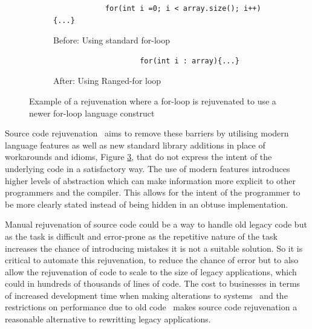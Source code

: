 \documentclass[bsc,frontabs,singlespacing,twoside,parskip,deptreport]{infthesis}
\begin{document}
\begin{figure}[H]
    \centering
    
    \begin{subfigure}[h]{\textwidth}
        \begin{verbatim}
            for(int i =0; i < array.size(); i++){...}
        \end{verbatim}
        \caption{Before: Using standard for-loop}
        \vspace{0.2cm}
        \label{fig:for-arr-before}
    \end{subfigure}
    
    \begin{subfigure}[h]{\textwidth}
        \centering
        \begin{verbatim}
                    for(int i : array){...}
        \end{verbatim}
        \caption{After: Using Ranged-for loop}
        \label{fig:for-arr-after}
    \end{subfigure}

    \caption{Example of a rejuvenation where a for-loop is rejuvenated to use a newer for-loop language construct}
    \label{fig:example-rejuv}
\end{figure}


    
Source code rejuvenation~\cite{STROUSTRUP_REJUV} aims to remove these barriers by utilising modern language features as well as new standard library additions in place of workarounds and idioms, Figure \ref{fig:example-rejuv}, that do not express the intent of the underlying code in a satisfactory way. The use of modern features introduces higher levels of abstraction which can make information more explicit to other programmers and the compiler. This allows for the intent of the programmer to be more clearly stated instead of being hidden in an obtuse implementation. 

Manual rejuvenation of source code could be a way to handle old legacy code but as the task is difficult and error-prone as the repetitive nature of the task increases the chance of introducing mistakes it is not a suitable solution. So it is critical to automate this rejuvenation, to reduce the chance of error but to also allow the rejuvenation of code to scale to the size of legacy applications, which could in hundreds of thousands of lines of code. The cost to businesses in terms of increased development time when making alterations to systems~\cite{LEGACY_MOD} and the restrictions on performance due to old code~\cite{HPC} makes source code rejuvenation a reasonable alternative to rewritting legacy applications.
\end{document}
